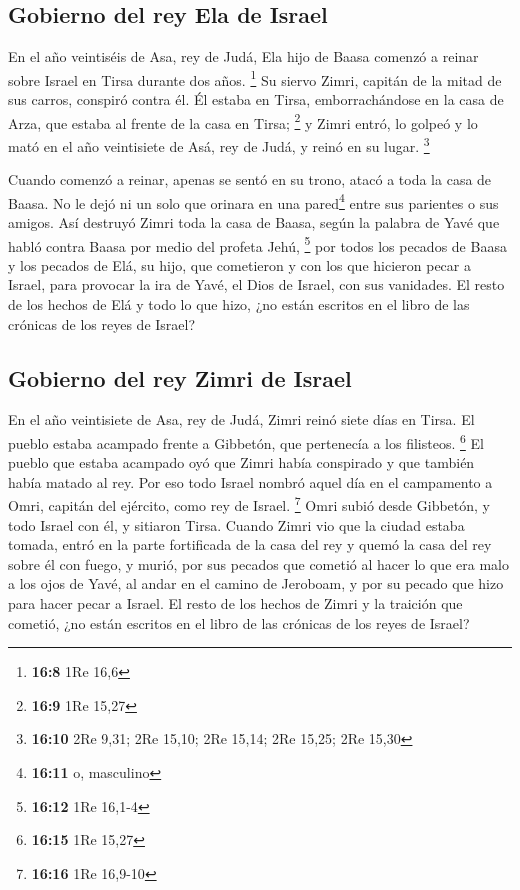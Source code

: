 \hypertarget{gobierno-del-rey-ela-de-israel}{%
\subsection{Gobierno del rey Ela de
Israel}\label{gobierno-del-rey-ela-de-israel}}

 En el año veintiséis de Asa, rey de Judá, Ela hijo de
Baasa comenzó a reinar sobre Israel en Tirsa durante dos años.
\footnote{\textbf{16:8} 1Re 16,6}  Su siervo Zimri,
capitán de la mitad de sus carros, conspiró contra él. Él estaba en
Tirsa, emborrachándose en la casa de Arza, que estaba al frente de la
casa en Tirsa; \footnote{\textbf{16:9} 1Re 15,27}  y
Zimri entró, lo golpeó y lo mató en el año veintisiete de Asá, rey de
Judá, y reinó en su lugar. \footnote{\textbf{16:10} 2Re 9,31; 2Re 15,10;
  2Re 15,14; 2Re 15,25; 2Re 15,30}

 Cuando comenzó a reinar, apenas se sentó en su trono,
atacó a toda la casa de Baasa. No le dejó ni un solo que orinara en una
pared\footnote{\textbf{16:11} o, masculino} entre sus parientes o sus
amigos.  Así destruyó Zimri toda la casa de Baasa, según
la palabra de Yavé que habló contra Baasa por medio del profeta Jehú,
\footnote{\textbf{16:12} 1Re 16,1-4}  por todos los
pecados de Baasa y los pecados de Elá, su hijo, que cometieron y con los
que hicieron pecar a Israel, para provocar la ira de Yavé, el Dios de
Israel, con sus vanidades.  El resto de los hechos de Elá
y todo lo que hizo, ¿no están escritos en el libro de las crónicas de
los reyes de Israel?

\hypertarget{gobierno-del-rey-zimri-de-israel}{%
\subsection{Gobierno del rey Zimri de
Israel}\label{gobierno-del-rey-zimri-de-israel}}

 En el año veintisiete de Asa, rey de Judá, Zimri reinó
siete días en Tirsa. El pueblo estaba acampado frente a Gibbetón, que
pertenecía a los filisteos. \footnote{\textbf{16:15} 1Re 15,27}
 El pueblo que estaba acampado oyó que Zimri había
conspirado y que también había matado al rey. Por eso todo Israel nombró
aquel día en el campamento a Omri, capitán del ejército, como rey de
Israel. \footnote{\textbf{16:16} 1Re 16,9-10}  Omri subió
desde Gibbetón, y todo Israel con él, y sitiaron Tirsa. 
Cuando Zimri vio que la ciudad estaba tomada, entró en la parte
fortificada de la casa del rey y quemó la casa del rey sobre él con
fuego, y murió,  por sus pecados que cometió al hacer lo
que era malo a los ojos de Yavé, al andar en el camino de Jeroboam, y
por su pecado que hizo para hacer pecar a Israel.  El
resto de los hechos de Zimri y la traición que cometió, ¿no están
escritos en el libro de las crónicas de los reyes de Israel?

